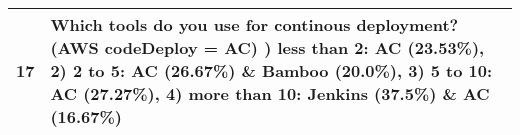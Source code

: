\begin{table}[!ht]
\begin{tabularx}{\textwidth}{v|k}
        17 & Which tools do you use for continous deployment? (AWS codeDeploy = AC) ) less than 2: AC (23.53\%), 2) 2 to 5: AC (26.67\%) \& Bamboo (20.0\%), 3) 5 to 10: AC (27.27\%), 4) more than 10: Jenkins (37.5\%) \& AC (16.67\%)  \\
        \hline
    \end{tabularx}
    \label{table:analysis_by_experience_part2}
\end{table}